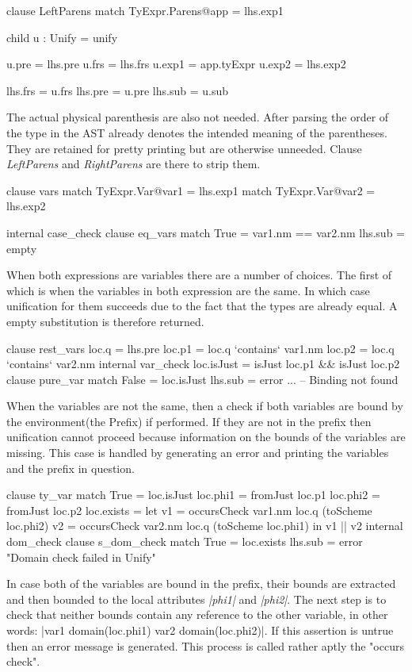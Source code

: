 \begin{code}
clause LeftParens
  match TyExpr.Parens@app = lhs.exp1
  
  child u : Unify = unify
  
  u.pre    = lhs.pre
  u.frs    = lhs.frs
  u.exp1   = app.tyExpr
  u.exp2   = lhs.exp2
           
  lhs.frs  = u.frs
  lhs.pre  = u.pre
  lhs.sub  = u.sub
\end{code}
The actual physical parenthesis are also not needed. After parsing the order of the type in the AST already denotes the intended meaning of the parentheses. They are retained for pretty printing but are otherwise unneeded. Clause \emph{LeftParens} and \emph{RightParens} are there to strip them.

\begin{code}
clause vars
  match TyExpr.Var@var1 = lhs.exp1
  match TyExpr.Var@var2 = lhs.exp2
  
  internal case_check
    clause eq_vars
      match True = var1.nm == var2.nm
      lhs.sub = empty
\end{code}
When both expressions are variables there are a number of choices. The first of which is when the variables in both expression are the same. In which case unification for them succeeds due to the fact that the types are already equal. A empty substitution is therefore returned.

\begin{code}
clause rest_vars
  loc.q  = lhs.pre
  loc.p1 = loc.q `contains` var1.nm
  loc.p2 = loc.q `contains` var2.nm
  internal var_check
    loc.isJust    = isJust loc.p1 && isJust loc.p2
    clause pure_var
      match False = loc.isJust
      lhs.sub = error ... -- Binding not found
\end{code}
When the variables are not the same, then a check if both variables are bound by the environment(the Prefix) if performed. If they are not in the prefix then unification cannot proceed because information on the bounds of the variables are missing. This case is handled by generating an error and printing the variables and the prefix in question.

\begin{code} 
clause ty_var
  match True  = loc.isJust
  loc.phi1 = fromJust loc.p1
  loc.phi2 = fromJust loc.p2
  loc.exists =  let  v1  = occursCheck var1.nm loc.q (toScheme loc.phi2)
                     v2  = occursCheck var2.nm loc.q (toScheme loc.phi1)
                in v1 || v2
  internal dom_check
    clause s_dom_check
      match True  = loc.exists
      lhs.sub     = error "Domain check failed in Unify"
\end{code}
In case both of the variables are bound in the prefix, their bounds are extracted and then bounded to the local attributes \emph{|phi1|} and \emph{|phi2|}. The next step is to check that neither bounds contain any reference to the other variable, in other words: |var1 \notin domain(loc.phi1) \cap var2 \notin domain(loc.phi2)|. If this assertion is untrue then an error message is generated. This process is called rather aptly the "occurs check".

